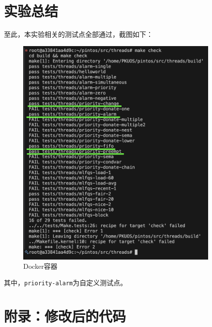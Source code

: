 \documentclass{article}
\begin{document}
\normalsize

\section{实验总结}

至此，本实验相关的测试点全部通过，截图如下：

\begin{figure}[H]
	\centering
	\includegraphics[width=0.9\textwidth]{img/make_check_lab4.png}
	\caption{Docker容器}
\end{figure}

其中，\texttt{priority-alarm}为自定义测试点。

\normalsize

\section{附录：修改后的代码}
\end{document}
